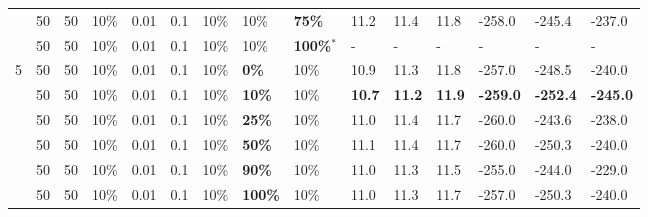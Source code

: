 \begin{table}
\begin{tabular}{|l|l|l|l|l|l|l|l|l||l|l|l|l|l|l|}
    ~ & 50 & 50 & 10\% & 0.01 & 0.1 & 10\% & 10\% & \textbf{75\%} & 11.2 & 11.4 & 11.8 & -258.0 & -245.4 & -237.0 \\
    ~ & 50 & 50 & 10\% & 0.01 & 0.1 & 10\% & 10\% & \textbf{100\%$^*$} & - & - & - & - & - & - \\
    \hline
    5 & 50 & 50 & 10\% & 0.01 & 0.1 & 10\% & \textbf{0\%} & 10\% & 10.9 & 11.3 & 11.8 & -257.0 & -248.5 & -240.0 \\
    ~ & 50 & 50 & 10\% & 0.01 & 0.1 & 10\% & \textbf{10\%} & 10\% & \textbf{10.7} & \textbf{11.2} & \textbf{11.9} & \textbf{-259.0} & \textbf{-252.4} & \textbf{-245.0} \\
    ~ & 50 & 50 & 10\% & 0.01 & 0.1 & 10\% & \textbf{25\%} & 10\% & 11.0 & 11.4 & 11.7 & -260.0 & -243.6 & -238.0 \\
    ~ & 50 & 50 & 10\% & 0.01 & 0.1 & 10\% & \textbf{50\%} & 10\% & 11.1 & 11.4 & 11.7 & -260.0 & -250.3 & -240.0 \\
    ~ & 50 & 50 & 10\% & 0.01 & 0.1 & 10\% & \textbf{90\%} & 10\% & 11.0 & 11.3 & 11.5 & -255.0 & -244.0 & -229.0 \\
    ~ & 50 & 50 & 10\% & 0.01 & 0.1 & 10\% & \textbf{100\%} & 10\% & 11.0 & 11.3 & 11.7 & -257.0 & -250.3 & -240.0 \\


\end{tabular}
\end{table}
